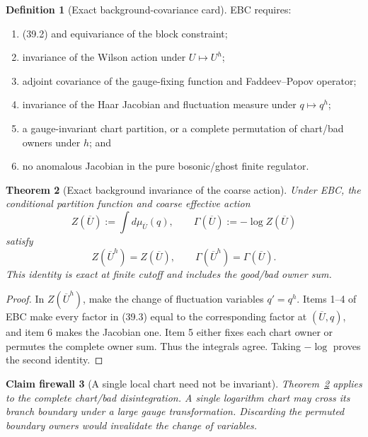 \documentclass[11pt,oneside]{book}
\newtheorem{theorem}{Theorem}[chapter]
\newtheorem{firewall}[theorem]{Claim firewall}
\theoremstyle{definition}
\newtheorem{definition}[theorem]{Definition}
\theoremstyle{remark}
\begin{document}
\begin{definition}[Exact background-covariance card]
\label{def:e8v39-EBC}
EBC requires:
\begin{enumerate}
\item (39.2) and equivariance of the block constraint;
\item invariance of the Wilson action under \(U\mapsto U^h\);
\item adjoint covariance of the gauge-fixing function and
      Faddeev--Popov operator;
\item invariance of the Haar Jacobian and fluctuation measure under
      \(q\mapsto q^h\);
\item a gauge-invariant chart partition, or a complete permutation of
      chart/bad owners under \(h\); and
\item no anomalous Jacobian in the pure bosonic/ghost finite
      regulator.
\end{enumerate}
\end{definition}

\begin{theorem}[Exact background invariance of the coarse action]
\label{thm:e8v39-background-invariance}
Under EBC, the conditional partition function and coarse effective
action
\[
 Z(\overline U):=\int d\mu_{\overline U}(q),\qquad
 \Gamma(\overline U):=-\log Z(\overline U)                       \tag{39.4}
\]
satisfy
\[
                         Z(\overline U^h)=Z(\overline U),\qquad
                         \Gamma(\overline U^h)=\Gamma(\overline U).
                                                                    \tag{39.5}
\]
This identity is exact at finite cutoff and includes the good/bad
owner sum.
\end{theorem}

\begin{proof}
In \(Z(\overline U^h)\), make the change of fluctuation variables
\(q'=q^h\).  Items 1--4 of EBC make every factor in (39.3) equal to
the corresponding factor at \((\overline U,q)\), and item 6 makes
the Jacobian one.  Item 5 either fixes each chart owner or permutes
the complete owner sum.  Thus the integrals agree.  Taking
\(-\log\) proves the second identity.
\end{proof}

\begin{firewall}[A single local chart need not be invariant]
\label{fire:e8v39-chart}
Theorem~\ref{thm:e8v39-background-invariance} applies to the complete
chart/bad disintegration.  A single logarithm chart may cross its
branch boundary under a large gauge transformation.  Discarding the
permuted boundary owners would invalidate the change of variables.
\end{firewall}
\end{document}
